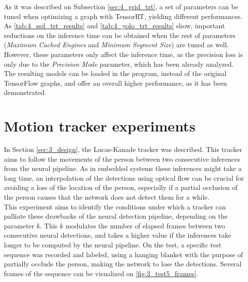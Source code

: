 As it was described on Subsection \ref{sec:4_grid_trt}, a set of parameters can be tuned when optimizing a graph with TensorRT, yielding different performances. As \autoref{tab:4_ssd_trt_results} and \autoref{tab:4_yolo_trt_results} show, important reductions on the inference time can be obtained when the rest of parameters (\textit{Maximum Cached Engines} and \textit{Minimum Segment Size}) are tuned as well. However, these parameters only affect the inference time, as the precision loss is only due to the \textit{Precision Mode} parameter, which has been already analyzed.\\

The resulting models can be loaded in the program, instead of the original TensorFlow graphs, and offer an overall higher performance, as it has been demonstrated.






\section{Motion tracker experiments}

\label{sec:4_test5}
In Section \ref{sec:3_design}, the Lucas-Kanade tracker was described. This tracker aims to follow the movements of the person between two consecutive inferences from the neural pipeline. As in embedded systems these inferences might take a long time, an interpolation of the detections using optical flow can be crucial for avoiding a loss of the location of the person, especially if a partial occlusion of the person causes that the network does not detect them for a while.\\

This experiment aims to identify the conditions under which a tracker can palliate these drawbacks of the neural detection pipeline, depending on the parameter $k$. This $k$ modulates the number of elapsed frames between two consecutive neural detections, and takes a higher value if the inferences take longer to be computed by the neural pipeline. On the test, a specific test sequence was recorded and labeled, using a hanging blanket with the purpose of partially occlude the person, making the network to lose the detections. Several frames of the sequence can be visualized on \autoref{fig:3_test5_frames}.\\


